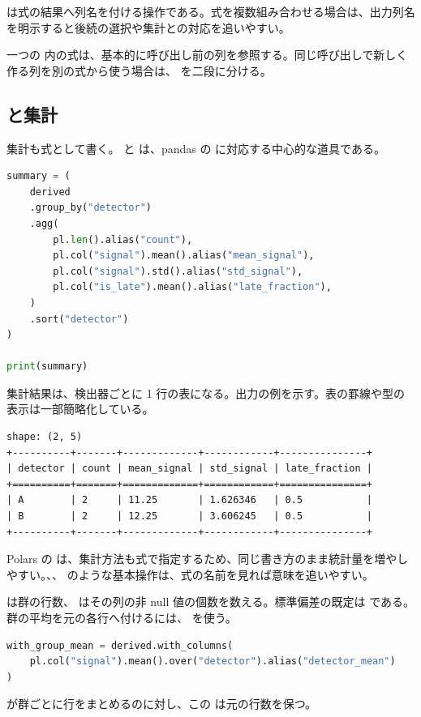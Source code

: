  は式の結果へ列名を付ける操作である。式を複数組み合わせる場合は、出力列名を明示すると後続の選択や集計との対応を追いやすい。

一つの  内の式は、基本的に呼び出し前の列を参照する。同じ呼び出しで新しく作る列を別の式から使う場合は、 を二段に分ける。

\subsection{ と集計}

集計も式として書く。 と  は、pandas の  に対応する中心的な道具である。

\begin{lstlisting}[language=Python]
summary = (
    derived
    .group_by("detector")
    .agg(
        pl.len().alias("count"),
        pl.col("signal").mean().alias("mean_signal"),
        pl.col("signal").std().alias("std_signal"),
        pl.col("is_late").mean().alias("late_fraction"),
    )
    .sort("detector")
)

print(summary)
\end{lstlisting}

集計結果は、検出器ごとに 1 行の表になる。出力の例を示す。表の罫線や型の表示は一部簡略化している。

\begin{lstlisting}[numbers=none, xleftmargin=2\zw]
shape: (2, 5)
+----------+-------+-------------+------------+---------------+
| detector | count | mean_signal | std_signal | late_fraction |
+==========+=======+=============+============+===============+
| A        | 2     | 11.25       | 1.626346   | 0.5           |
| B        | 2     | 12.25       | 3.606245   | 0.5           |
+----------+-------+-------------+------------+---------------+
\end{lstlisting}

Polars の  は、集計方法も式で指定するため、同じ書き方のまま統計量を増やしやすい。、、 のような基本操作は、式の名前を見れば意味を追いやすい。

 は群の行数、 はその列の非 null 値の個数を数える。標準偏差の既定は  である。群の平均を元の各行へ付けるには、 を使う。
\begin{lstlisting}[language=Python]
with_group_mean = derived.with_columns(
    pl.col("signal").mean().over("detector").alias("detector_mean")
)
\end{lstlisting}
 が群ごとに行をまとめるのに対し、この  は元の行数を保つ。

